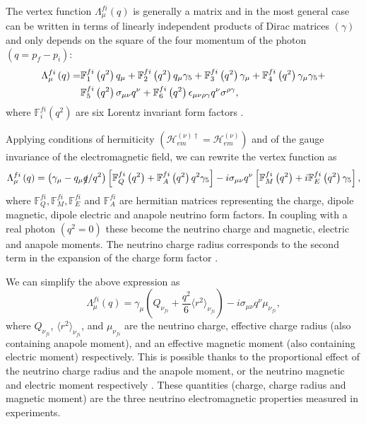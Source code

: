 The vertex function $\Lambda^{fi}_{\mu}\left(q\right)$ is generally a matrix and in the most general case can be written in terms of linearly independent products of Dirac matrices $\left(\gamma\right)$ and only depends on the square of the four momentum of the photon $\left(q=p_f-p_i\right)$:
\begin{align}
\Lambda^{fi}_{\mu}\left(q\right)=&
\mathbb{F}^{fi}_1\left(q^2\right)q_{\mu}+
\mathbb{F}^{fi}_2\left(q^2\right)q_{\mu}\gamma_5+
\mathbb{F}^{fi}_3\left(q^2\right)\gamma_{\mu}+
\mathbb{F}^{fi}_4\left(q^2\right)\gamma_{\mu}\gamma_5+\notag\\ &
\mathbb{F}^{fi}_5\left(q^2\right)\sigma_{\mu\nu}q^{\nu}+
\mathbb{F}^{fi}_6\left(q^2\right)\epsilon_{\mu\nu\rho\gamma}q^{\nu}\sigma^{\rho\gamma},
\end{align}
where $\mathbb{F}^{fi}_i\left(q^2\right)$ are six Lorentz invariant form factors \cite{nuElmagInt2015.pdf}.

Applying conditions of hermiticity $\left(\mathcal{H}^{\left(\nu\right)\dagger}_{em}=\mathcal{H}^{\left(\nu\right)}_{em}\right)$ and of the gauge invariance of the electromagnetic field, we can rewrite the vertex function as
\begin{equation}
\Lambda^{fi}_{\mu}\left(q\right)=
\left(\gamma_{\mu}-q_{\mu}\slashed{q}/q^2\right)\left[
\mathbb{F}^{fi}_{Q}\left(q^2\right)+\mathbb{F}^{fi}_{A}\left(q^2\right)q^2\gamma_5\right]-
i\sigma_{\mu\nu}q^{\nu}\left[\mathbb{F}^{fi}_{M}\left(q^2\right)+i\mathbb{F}^{fi}_{E}\left(q^2\right)\gamma_5\right],
\end{equation}
where $\mathbb{F}^{fi}_Q,\mathbb{F}^{fi}_M,\mathbb{F}^{fi}_E$ and $\mathbb{F}^{fi}_A$ are hermitian matrices representing the charge, dipole magnetic, dipole electric and anapole neutrino form factors. In coupling with a real photon $\left(q^2=0\right)$ these become the neutrino charge and magnetic, electric and anapole moments. The neutrino charge radius corresponds to the second term in the expansion of the charge form factor \cite{nuElmagInt2015.pdf}.

We can simplify the above expression as \cite{NeutrinoPropertiesSnowmass2022.pdf}
\begin{equation}
\Lambda^{fi}_{\mu}\left(q\right)=\gamma_{\mu}\left(Q_{\nu_{fi}}+\frac{q^2}{6}\langle r^2\rangle_{\nu_{fi}}\right)-i\sigma_{\mu\nu}q^{\nu}\mu_{\nu_{fi}},
\end{equation}
where $Q_{\nu_{fi}}$, $\langle r^2\rangle_{\nu_{fi}}$, and $\mu_{\nu_{fi}}$ are the neutrino charge, effective charge radius (also containing anapole moment), and an effective magnetic moment (also containing electric moment) respectively. This is possible thanks to the proportional effect of the neutrino charge radius and the anapole moment, or the neutrino magnetic and electric moment respectively \cite{nuElmagInt2015.pdf}. These quantities (charge, charge radius and magnetic moment) are the three neutrino electromagnetic properties measured in experiments.

